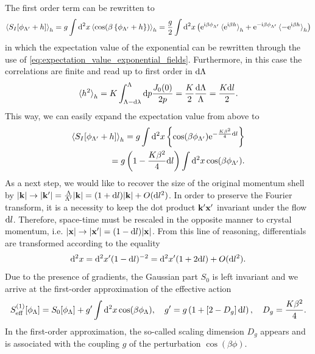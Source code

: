 The first order term can be rewritten to
\begin{align}
    \braket{S_I[\phi_{\Lambda'}+h]}_h = g\int\mathrm d^2x\braket{\cos(\beta\left\{ \phi_{\Lambda'}+h \right\})}_h
    = \frac g2\int\mathrm d^2x\left( \mathrm e^{\mathrm i\beta \phi_{\Lambda'}}\braket{\mathrm e^{\mathrm i\beta h}}_h+\mathrm e^{-\mathrm i\beta \phi_{\Lambda'}}\braket{-\mathrm e^{\mathrm i\beta h}}_h \right)
\end{align}
in which the expectation value of the exponential can be rewritten through the use of \cref{eq:expectation_value_exponential_fields}.
Furthermore, in this case the correlations are finite and read up to first order in $\mathrm d\Lambda$
\begin{align}
    \braket{h^2}_h = K\int_{\Lambda-\mathrm d\lambda}^\Lambda\mathrm d p\frac{J_0(0)}{2p} = \frac K2\frac{\mathrm d\Lambda}\Lambda = \frac{K\mathrm d l}2.
    \label{eq:rg_hsq}
\end{align}
This way, we can easily expand the expectation value from above to
\begin{align}
    \braket{S_I[\phi_{\Lambda'}+h]}_h
    = g\int\mathrm d^2x\left\{ \cos(\beta \phi_{\Lambda'})\mathrm e^{-\frac{K\beta^2}4\mathrm d l} \right\}
    \\
    = g\left( 1 - \frac{K\beta^2}4\mathrm d l \right)\int\mathrm d^2x\cos(\beta \phi_{\Lambda'}).
\end{align}
As a next step, we would like to recover the size of the original momentum shell by $|{\bf k}|\rightarrow |{\bf k}'|=\frac{\Lambda}{\Lambda'}|{\bf k}| = (1+\mathrm d l)|{\bf k}|+O(\mathrm d l^2)$.
In order to preserve the Fourier transform, it is a necessity to keep the dot product ${\bf k'}{\bf x'}$ invariant under the flow $\mathrm d l$.
Therefore, space-time must be rescaled in the opposite manner to crystal momentum, i.e. $|{\bf x}|\rightarrow|{\bf x'}|=(1-\mathrm d l)|{\bf x}|$.
From this line of reasoning, differentials are transformed according to the equality
\begin{align}
    \mathrm d^2x = \mathrm d^2 x'(1-\mathrm d l)^{-2} = \mathrm d^2 x'(1+2\mathrm d l) + O(\mathrm d l^2).
\end{align}
Due to the presence of gradients, the Gaussian part $S_0$ is left invariant and we arrive at the first-order approximation of the effective action
\begin{align}
    S^{(1)}_{\rm eff}[\phi_\Lambda]=S_0[\phi_\Lambda] + g'\int\mathrm d^2x\cos(\beta \phi_{\Lambda}),
    \quad
    g' = g\left( 1 + \left[ 2-D_g \right]\mathrm d l \right),
    \quad
    D_g=\frac{K\beta^2}4.
    \label{eq:bkt_first_order}
\end{align}
In the first-order approximation, the so-called scaling dimension $D_g$ appears and is associated with the coupling $g$ of the perturbation $\cos(\beta\phi)$.
